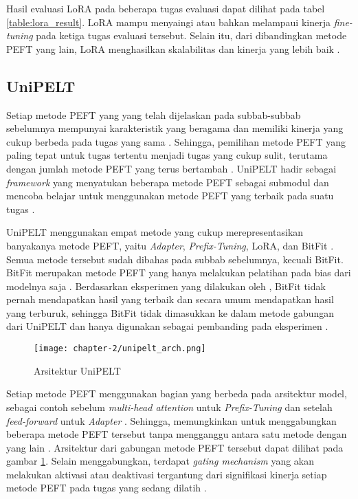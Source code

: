 Hasil evaluasi LoRA pada beberapa tugas evaluasi dapat dilihat pada tabel \ref{table:lora_result}. LoRA mampu menyaingi atau bahkan melampaui kinerja \textit{fine-tuning} pada ketiga tugas evaluasi tersebut. Selain itu, dari dibandingkan metode PEFT yang lain, LoRA menghasilkan skalabilitas dan kinerja yang lebih baik \parencite{lora}.

\subsection{UniPELT}

Setiap metode PEFT yang yang telah dijelaskan pada subbab-subbab sebelumnya mempunyai karakteristik yang beragama dan memiliki kinerja yang cukup berbeda pada tugas yang sama \parencite{unipelt}. Sehingga, pemilihan metode PEFT yang paling tepat untuk tugas tertentu menjadi tugas yang cukup sulit, terutama dengan jumlah metode PEFT yang terus bertambah \parencite{unipelt}. UniPELT hadir sebagai \textit{framework} yang menyatukan beberapa metode PEFT sebagai submodul dan mencoba belajar untuk menggunakan metode PEFT yang terbaik pada suatu tugas \parencite{unipelt}.

UniPELT menggunakan empat metode yang cukup merepresentasikan banyakanya metode PEFT, yaitu \textit{Adapter}, \textit{Prefix-Tuning}, LoRA, dan BitFit \parencite{unipelt}. Semua metode tersebut sudah dibahas pada subbab sebelumnya, kecuali BitFit. BitFit merupakan metode PEFT yang hanya melakukan pelatihan pada bias dari modelnya saja \parencite{unipelt}. Berdasarkan eksperimen yang dilakukan oleh \citeauthor{unipelt}, BitFit tidak pernah mendapatkan hasil yang terbaik dan secara umum mendapatkan hasil yang terburuk, sehingga BitFit tidak dimasukkan ke dalam metode gabungan dari UniPELT dan hanya digunakan sebagai pembanding pada eksperimen \parencite{unipelt}.

\begin{figure}[h]
    \vspace{0.25cm}
    \centering
    \texttt{[image: chapter-2/unipelt\_arch.png]}
    \caption{Arsitektur UniPELT \parencite{unipelt}}
    \label{fig:unipelt_arch}
\end{figure}

Setiap metode PEFT menggunakan bagian yang berbeda pada arsitektur model, sebagai contoh sebelum \textit{multi-head attention} untuk \textit{Prefix-Tuning} dan setelah \textit{feed-forward} untuk \textit{Adapter} \parencite{unipelt}. Sehingga, memungkinkan untuk menggabungkan beberapa metode PEFT tersebut tanpa mengganggu antara satu metode dengan yang lain \parencite{unipelt}. Arsitektur dari gabungan metode PEFT tersebut dapat dilihat pada gambar \ref{fig:unipelt_arch}. Selain menggabungkan, terdapat \textit{gating mechanism} yang akan melakukan aktivasi atau deaktivasi tergantung dari signifikasi kinerja setiap metode PEFT pada tugas yang sedang dilatih \parencite{unipelt}.

